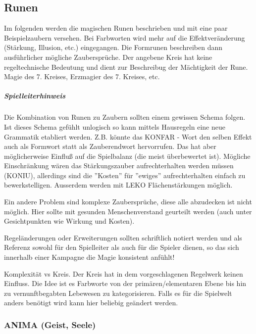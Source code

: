 \documentclass{article}
\begin{document}
\begin{center}
\subsection{Runen}
\end{center}

Im folgenden werden die magischen Runen beschrieben und mit eine paar Beispielzaubern versehen. Bei Farbworten wird
mehr auf die Effektveränderung (Stärkung, Illusion, etc.) eingegangen. Die Formrunen beschreiben dann ausführlicher
mögliche Zaubersprüche. Der angebene Kreis hat keine regeltechnische Bedeutung und dient zur Beschreibug der
Mächtigkeit der Rune. Magie des 7. Kreises, Erzmagier des 7. Kreises, etc.

\begin{mdframed}[hidealllines=true, backgroundcolor=black!10]
\subparagraph{Spielleiterhinweis}

Die Kombination von Runen zu Zaubern sollten einem gewissen Schema folgen. Ist dieses Schema gefühlt unlogisch so
kann mittels Hausregeln eine neue Grammatik etabliert werden. Z.B. könnte das KONFAR - Wort den selben Effekt auch
als Formwort statt als Zauberendwort hervorrufen. Das hat aber möglicherweise Einfluß auf die Spielbalanz (die meist
überbewertet ist). Mögliche Einschränkung wären das Stärkungszauber aufrechterhalten werden müssen (KONIU),
allerdings sind die ''Kosten'' für ''ewiges'' aufrechterhalten einfach zu bewerkstelligen. Ausserdem werden mit LEKO
Flächenstärkungen möglich.

Ein andere Problem sind komplexe Zaubersprüche, diese alle abzudecken ist nicht möglich. Hier sollte mit gesunden
Menschenverstand geurteilt werden (auch unter Gesichtpunkten wie Wirkung und Kosten).

Regeländerungen oder Erweiterungen sollten schriftlich notiert werden und als Referenz sowohl für den Spielleiter
als auch für die Spieler dienen, so das sich innerhalb einer Kampagne die Magie konsistent anfühlt!

Komplexität vs Kreis. Der Kreis hat in dem vorgeschlagenen Regelwerk keinen Einfluss. Die Idee ist es Farbworte
von der primären/elementaren Ebene bis hin zu vernunftbegabten Lebewesen zu kategorisieren. Falls es für die
Spielwelt anders benötigt wird kann hier beliebig geändert werden.

\end{mdframed}
\subsubsection{ANIMA (Geist, Seele)}
\end{document}
